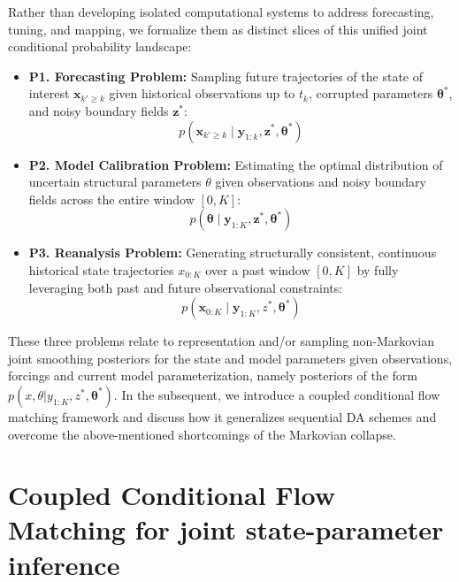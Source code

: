 \documentclass[10pt]{article}
\begin{document}
Rather than developing isolated computational systems to address forecasting, tuning, and mapping, we formalize them as distinct slices of this unified joint conditional probability landscape:
\begin{itemize}
    \item \textbf{P1. Forecasting Problem:} Sampling future trajectories of the state of interest $\mathbf{x}_{k' \ge k}$ given historical observations up to $t_k$, corrupted parameters $\mathbf{\theta}^*$, and noisy boundary fields $\mathbf{z}^*$:
    \begin{equation}
        p(\mathbf{x}_{k' \ge k} \mid \mathbf{y}_{1:k}, \mathbf{z}^*, \mathbf{\theta}^*)
    \end{equation}
    \item \textbf{P2. Model Calibration Problem:} Estimating the optimal distribution of uncertain structural parameters $\theta$ given observations and noisy boundary fields across the entire window $[0, K]$:
    \begin{equation}
        p(\mathbf{\theta} \mid \mathbf{y}_{1:K}, \mathbf{z}^*, \mathbf{\theta}^*)
    \end{equation}
    \item \textbf{P3. Reanalysis Problem:} Generating structurally consistent, continuous historical state trajectories $x_{0:K}$ over a past window $[0, K]$ by fully leveraging both past and future observational constraints:
    \begin{equation}
        p(\mathbf{x}_{0:K} \mid \mathbf{y}_{1:K}, z^*, \mathbf{\theta}^*)
    \end{equation}
\end{itemize}
These three problems relate to representation and/or sampling non-Markovian joint smoothing posteriors for the state and model parameters given observations, forcings and current model parameterization, namely posteriors of the form $p({x},{\theta} | {y}_{1:K}, z^*, \mathbf{\theta}^*)$. In the subsequent, we introduce a coupled conditional flow matching framework and discuss how it generalizes sequential DA schemes and overcome the above-mentioned shortcomings of  the Markovian collapse.

\section{Coupled Conditional Flow Matching for joint state-parameter inference}
\end{document}
